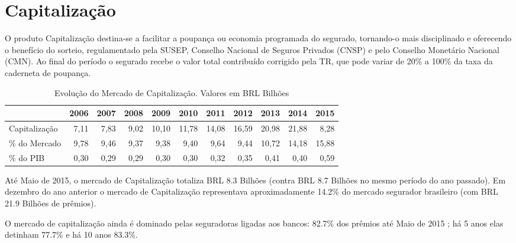 \documentclass[../../relatorio.tex]{subfiles}
\begin{document}
\section{Capitalização}

O produto Capitalização destina-se a facilitar a poupança ou economia programada do segurado, tornando-o mais disciplinado e oferecendo o benefício do sorteio, regulamentado pela SUSEP, Conselho Nacional de Seguros Privados (CNSP) e pelo Conselho Monetário Nacional (CMN). Ao final do período o segurado recebe o valor total contribuído corrigido pela TR, que pode variar de 20\% a 100\% da taxa da caderneta de poupança.

\begin{table}[ht]
\centering
\begin{tabular}{lrrrrrrrrrr}
  \hline
 & 2006 & 2007 & 2008 & 2009 & 2010 & 2011 & 2012 & 2013 & 2014 & 2015 \\ 
  \hline
\hline
Capitalização & 7,11 & 7,83 & 9,02 & 10,10 & 11,78 & 14,08 & 16,59 & 20,98 & 21,88 & 8,28 \\ 
   \hline
\% do Mercado & 9,78 & 9,46 & 9,37 & 9,38 & 9,40 & 9,64 & 9,44 & 10,72 & 14,18 & 15,88 \\ 
   \hline
\% do PIB & 0,30 & 0,29 & 0,29 & 0,30 & 0,30 & 0,32 & 0,35 & 0,41 & 0,40 & 0,59 \\ 
   \hline
\end{tabular}
\caption{Evolução do Mercado de Capitalização. Valores em BRL Bilhões} 
\end{table}
Até Maio de 2015, o mercado de Capitalização totaliza BRL 8.3 Bilhões (contra BRL 8.7 Bilhões no mesmo período do ano passado). Em dezembro do ano anterior o mercado de Capitalização representava aproximadamente 14.2\% do mercado segurador brasileiro (com BRL 21.9 Bilhões de prêmios).

O mercado de capitalização ainda é dominado pelas seguradoras ligadas aos bancos: 82.7\% dos prêmios até Maio de 2015 ; há 5 anos elas detinham 77.7\% e há 10 anos 83.3\%.
\end{document}
